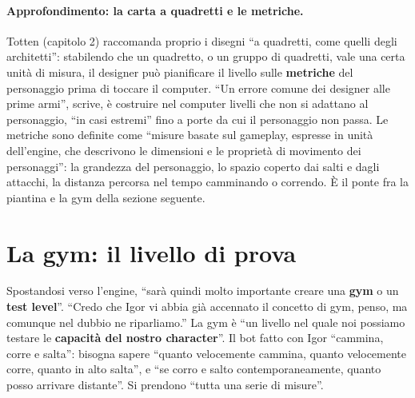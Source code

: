 \paragraph{Approfondimento: la carta a quadretti e le metriche.} Totten (capitolo 2)
raccomanda proprio i disegni ``a quadretti, come quelli degli architetti'': stabilendo che
un quadretto, o un gruppo di quadretti, vale una certa unità di misura, il designer può
pianificare il livello sulle \textbf{metriche} del personaggio prima di toccare il
computer. ``Un errore comune dei designer alle prime armi'', scrive, è costruire nel
computer livelli che non si adattano al personaggio, ``in casi estremi'' fino a porte da
cui il personaggio non passa. Le metriche sono definite come ``misure basate sul gameplay,
espresse in unità dell'engine, che descrivono le dimensioni e le proprietà di movimento
dei personaggi'': la grandezza del personaggio, lo spazio coperto dai salti e dagli
attacchi, la distanza percorsa nel tempo camminando o correndo. È il ponte fra la piantina
e la gym della sezione seguente.

\section{La gym: il livello di prova}
\label{ue13:sec:gym}

Spostandosi verso l'engine, ``sarà quindi molto importante creare una \textbf{gym} o un
\textbf{test level}''. ``Credo che Igor vi abbia già accennato il concetto di gym, penso,
ma comunque nel dubbio ne riparliamo.'' La gym è ``un livello nel quale noi possiamo
testare le \textbf{capacità del nostro character}''. Il bot fatto con Igor ``cammina, corre e
salta'': bisogna sapere ``quanto velocemente cammina, quanto velocemente corre, quanto in
alto salta'', e ``se corro e salto contemporaneamente, quanto posso arrivare distante''. Si
prendono ``tutta una serie di misure''.

